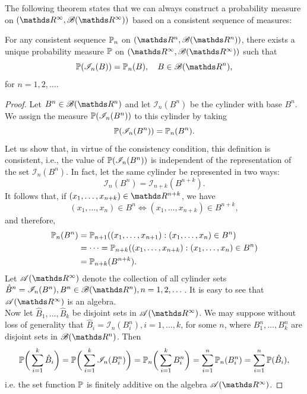 The following theorem states that we can always construct a probability measure on $(\R^\infty, \B(\R^\infty))$ based on a consistent sequence of measures:
\begin{theorem} \label{thm:kolmogorov_extension}
For any consistent sequence $\mathbb{P}_n$ on $(\R^n, \B(\R^n))$, there exists a unique probability measure $\mathbb{P}$ on $(\R^\infty, \B(\R^\infty))$ such that 
\begin{equation*}
    \p(\mathcal{I}_n(B)) = \p_n(B), \quad B \in \B(\R^n),
\end{equation*}
for $n = 1,2,\dots$.
\end{theorem}

\begin{unexaminable}
\begin{proof}
Let $B^n \in \B(\R^n)$ and let $\mathcal{I}_n(B^n)$ be the cylinder with base $B^n$. We assign the measure $\mathbb{P}(\mathcal{I}_n(B^n))$ to this cylinder by taking 
\begin{equation*}
    \mathbb{P}(\mathcal{I}_n(B^n)) = \mathbb{P}_n(B^n).
\end{equation*}
Let us show that, in virtue of the consistency condition, this definition is consistent, i.e., the value of $\mathbb{P}(\mathcal{I}_n(B^n))$ is independent of the representation of the set $\mathcal{I}_n(B^n)$. In fact, let the same cylinder be represented in two ways:
\begin{equation*}
    \mathcal{I}_n(B^n) = \mathcal{I}_{n+k}(B^{n+k}).
\end{equation*}
It follows that, if $(x_1, \dots, x_{n+k}) \in \R^{n+k}$, we have 
\begin{equation*}
    (x_1, \dots, x_n) \in B^n \iff (x_1, \dots, x_{n+k}) \in B^{n+k},
\end{equation*}
and therefore, 
\begin{align*}
    \mathbb{P}_n(B^n) &= \mathbb{P}_{n+1}((x_1, \dots, x_{n+1}): (x_1, \dots, x_{n}) \in B^n)\\
    &= \dots = \mathbb{P}_{n+k}((x_1, \dots, x_{n+k}): (x_1, \dots, x_{n}) \in B^n)\\
    &= \mathbb{P}_{n+k}(B^{n+k}).
\end{align*}
Let $\mathcal{A}(\R^{\infty})$ denote the collection of all cylinder sets $\hat{B}^n = \mathcal{I}_n(B^n), B^n \in \B(\R^n), n=1,2,\dots$. It is easy to see that $\mathcal{A}(\R^\infty)$ is an algebra.\\

Now let $\hat{B}_1, \dots, \hat{B}_k$ be disjoint sets in $\mathcal{A}(\R^\infty)$. We may suppose without loss of generality that $\hat{B}_i = \mathcal{I}_n(B_i^n), i=1, \dots, k$, for some $n$, where $B_1^n, \dots, B_k^n$ are disjoint sets in $\B(\R^n)$. Then
\begin{equation*}
    \mathbb{P} \bigg( \sum_{i=1}^k \hat{B}_i \bigg) = \mathbb{P} \bigg( \sum_{i=1}^k \mathcal{I}_n(B_i^n) \bigg) = \mathbb{P}_n \bigg( \sum_{i=1}^k B_i^n\bigg) = \sum_{i=1}^n \mathbb{P}_n(B_i^n) = \sum_{i=1}^n \mathbb{P}(\hat{B}_i),
\end{equation*}
i.e. the set function $\mathbb{P}$ is finitely additive on the algebra $\mathcal{A}(\R^\infty)$.


\end{proof}
\end{unexaminable}
